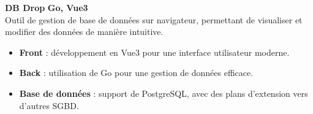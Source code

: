 \documentclass[a4paper,10pt]{article}
\begin{document}
\begin{paracol}{2}
\begin{flushleft}
  \textbf{DB Drop} \hfill \textbf{Go, Vue3} \\
  Outil de gestion de base de données sur navigateur, permettant de visualiser et modifier des données de manière intuitive.
  \begin{itemize}[left=0pt,label={--},nosep,topsep=2pt]
    \item \textbf{Front} : développement en Vue3 pour une interface utilisateur moderne.
    \item \textbf{Back} : utilisation de Go pour une gestion de données efficace.
    \item \textbf{Base de données} : support de PostgreSQL, avec des plans d'extension vers d'autres SGBD.
  \end{itemize}

\end{flushleft}
  
\end{paracol}
\end{document}
